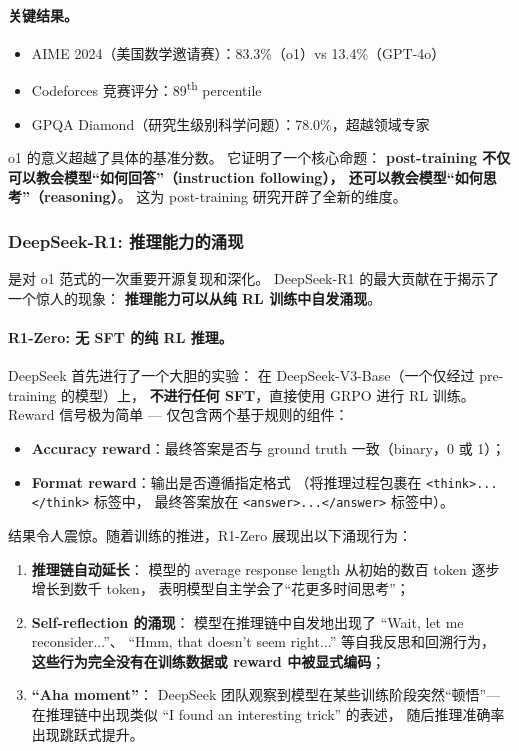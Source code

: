 \paragraph{关键结果。}
\begin{itemize}[leftmargin=2em]
  \item AIME 2024（美国数学邀请赛）：83.3\%（o1）vs 13.4\%（GPT-4o）
  \item Codeforces 竞赛评分：89\textsuperscript{th} percentile
  \item GPQA Diamond（研究生级别科学问题）：78.0\%，超越领域专家
\end{itemize}

\noindent
o1 的意义超越了具体的基准分数。
它证明了一个核心命题：
\textbf{post-training 不仅可以教会模型``如何回答''（instruction following），
还可以教会模型``如何思考''（reasoning）}。
这为 post-training 研究开辟了全新的维度。

\subsubsection{DeepSeek-R1: 推理能力的涌现}
\label{sec:t4-r1}

 是对 o1 范式的一次重要开源复现和深化。
DeepSeek-R1 的最大贡献在于揭示了一个惊人的现象：
\textbf{推理能力可以从纯 RL 训练中自发涌现}。

\paragraph{R1-Zero: 无 SFT 的纯 RL 推理。}
DeepSeek 首先进行了一个大胆的实验：
在 DeepSeek-V3-Base（一个仅经过 pre-training 的模型）上，
\textbf{不进行任何 SFT}，直接使用 GRPO 进行 RL 训练。
Reward 信号极为简单 --- 仅包含两个基于规则的组件：
\begin{itemize}[leftmargin=2em]
  \item \textbf{Accuracy reward}：最终答案是否与 ground truth 一致（binary，0 或 1）；
  \item \textbf{Format reward}：输出是否遵循指定格式
    （将推理过程包裹在 \texttt{<think>...</think>} 标签中，
    最终答案放在 \texttt{<answer>...</answer>} 标签中）。
\end{itemize}

\noindent
结果令人震惊。随着训练的推进，R1-Zero 展现出以下涌现行为：

\begin{enumerate}[leftmargin=2em]
  \item \textbf{推理链自动延长}：
    模型的 average response length 从初始的数百 token 逐步增长到数千 token，
    表明模型自主学会了``花更多时间思考''；

  \item \textbf{Self-reflection 的涌现}：
    模型在推理链中自发地出现了 ``Wait, let me reconsider...''、
    ``Hmm, that doesn't seem right...'' 等自我反思和回溯行为，
    \textbf{这些行为完全没有在训练数据或 reward 中被显式编码}；

  \item \textbf{``Aha moment''}：
    DeepSeek 团队观察到模型在某些训练阶段突然``顿悟''---
    在推理链中出现类似 ``I found an interesting trick'' 的表述，
    随后推理准确率出现跳跃式提升。
\end{enumerate}

